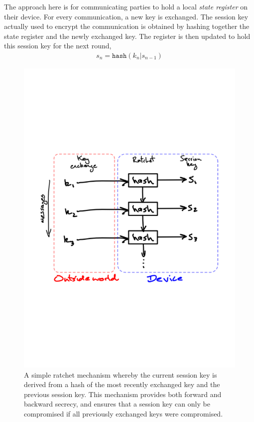 The approach here is for communicating parties to hold a local \emph{state register} on their device. For every communication, a new key is exchanged. The session key actually used to encrypt the communication is obtained by hashing together the state register and the newly exchanged key. The register is then updated to hold this session key for the next round,
\begin{align}
	s_n=\texttt{hash}(k_n|s_{n-1})
\end{align}

\begin{figure}[!htb]
	\centering
	\includegraphics[width=\columnwidth]{figures/Ratchet}
	\caption{A simple ratchet mechanism whereby the current session key is derived from a hash of the most recently exchanged key and the previous session key. This mechanism provides both forward and backward secrecy, and ensures that a session key can only be compromised if all previously exchanged keys were compromised.} \label{fig:ratchet}
\end{figure}

